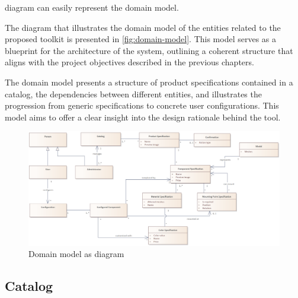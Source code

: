  diagram can easily represent the domain model.~\cite{Wlaschin2018}

The  diagram that illustrates the domain model of the entities related to the proposed toolkit is presented in \autoref{fig:domain-model}. This model serves as a blueprint for the architecture of the system, outlining a coherent structure that aligns with the project objectives described in the previous chapters. 

The domain model presents a structure of product specifications contained in a catalog, the dependencies between different entities, and illustrates the progression from generic specifications to concrete user configurations. This model aims to offer a clear insight into the design rationale behind the tool.

\begin{landscape}
\begin{figure}
\centering
\includegraphics[width=\linewidth]{images/uml_domainmodel.png}
\caption{Domain model as  diagram}
\label{fig:domain-model}
\end{figure}
\end{landscape}

\subsection{Catalog}

